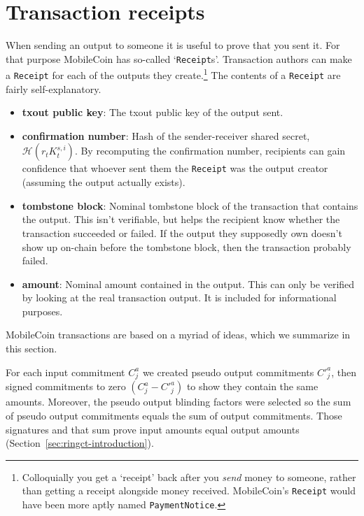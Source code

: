 \section{Transaction receipts}
\label{sec:transaction-receipts}

When sending an output to someone it is useful to prove that you sent it. For that purpose MobileCoin has so-called `{\tt Receipt}s'. Transaction authors can make a {\tt Receipt} for each of the outputs they create.\footnote{Colloquially you get a `receipt' back after you {\em send} money to someone, rather than getting a receipt alongside money received. MobileCoin's {\tt Receipt} would have been more aptly named {\tt PaymentNotice}.} The contents of a {\tt Receipt} are fairly self-explanatory.

\begin{itemize}
    \item \textbf{txout public key}: The txout public key of the output sent.

    \item \textbf{confirmation number}: Hash of the sender-receiver shared secret, $\mathcal{H}(r_t K^{s,i}_t)$. By recomputing the confirmation number, recipients can gain confidence that whoever sent them the {\tt Receipt} was the output creator (assuming the output actually exists).

    \item \textbf{tombstone block}: Nominal tombstone block of the transaction that contains the output. This isn't verifiable, but helps the recipient know whether the transaction succeeded or failed. If the output they supposedly own doesn't show up on-chain before the tombstone block, then the transaction probably failed.

    \item \textbf{amount}: Nominal amount contained in the output. This can only be verified by looking at the real transaction output. It is included for informational purposes.
\end{itemize}



MobileCoin transactions are based on a myriad of ideas, which we summarize in this section.

For each input commitment $C^a_j$ we created pseudo output commitments $C'^a_j$, then signed commitments to zero $(C^a_j - C'^a_j)$ to show they contain the same amounts. Moreover, the pseudo output blinding factors were selected so the sum of pseudo output commitments equals the sum of output commitments. Those signatures and that sum prove input amounts equal output amounts (Section~\ref{sec:ringct-introduction}).

